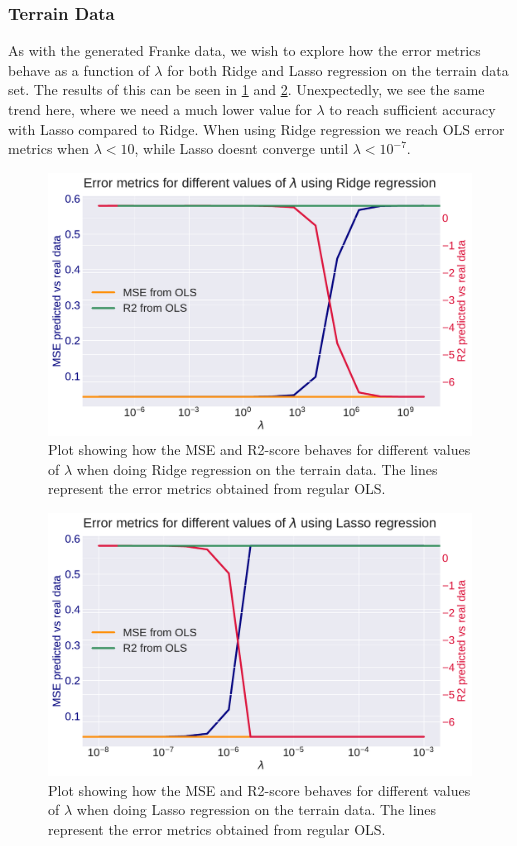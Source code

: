 \documentclass[10pt, twocolumn]{article}
\begin{document}
\subsubsection{Terrain Data}
As with the generated Franke data, we wish to explore how the error metrics behave as a function of $\lambda$ for both Ridge and Lasso regression on the terrain data set. The results of this can be seen in \cref{fig:lambda_ridge_terrain} and \cref{fig:lambda_lasso_terrain}. Unexpectedly, we see the same trend here, where we need a much lower value for $\lambda$ to reach sufficient accuracy with Lasso compared to Ridge. When using Ridge regression we reach OLS error metrics when $\lambda < 10$, while Lasso doesnt converge until $\lambda < 10^{-7}$.
\begin{figure}[h!]
    \centering
    \includegraphics[scale=0.4]{../figs/errormetrics_lambda_ridge_terrain.pdf}
    \caption{Plot showing how the MSE and R2-score behaves for different values of $\lambda$ when doing Ridge regression on the terrain data. The lines represent the error metrics obtained from regular OLS.}
    \label{fig:lambda_ridge_terrain}
\end{figure}

\begin{figure}[h!]
    \centering
    \includegraphics[scale=0.4]{../figs/errormetrics_lambda_lasso_terrain.pdf}
    \caption{Plot showing how the MSE and R2-score behaves for different values of $\lambda$ when doing Lasso regression on the terrain data. The lines represent the error metrics obtained from regular OLS.}
    \label{fig:lambda_lasso_terrain}
\end{figure}
\end{document}
